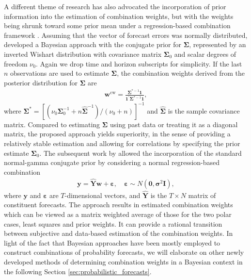 \documentclass[11pt]{article}
\begin{document}
A different theme of research has also advocated the incorporation of prior information into the estimation of combination weights, but with the weights being shrunk toward some prior mean under a regression-based combination framework \citep{Newbold2002-wa}. Assuming that the vector of forecast errors was normally distributed, \cite{Clemen1986-pd} developed a Bayesian approach with the conjugate prior for $\boldsymbol{\Sigma}$, represented by an inverted Wishart distribution with covariance matrix $\boldsymbol{\Sigma}_{0}$ and scalar degrees of freedom $\nu_{0}$. Again we drop time and horizon subscripts for simplicity. If the last $n$ observations are used to estimate $\boldsymbol{\Sigma}$, the combination weights derived from the posterior distribution for $\boldsymbol{\Sigma}$ are
\begin{align*}
\boldsymbol{w}^{\text{cw}}=\frac{\boldsymbol{\Sigma}^{*-1}\mathbf{1}}{\mathbf{1}^{\prime} \boldsymbol{\Sigma}^{*-1} \mathbf{1}},
\end{align*}
where $\boldsymbol{\Sigma}^{*}=\left[\left(\nu_{0} \boldsymbol{\Sigma}_{0}^{-1}+n \hat{\boldsymbol{\Sigma}}^{-1}\right) /(\nu_{0}+n)\right]^{-1}$ and $\hat{\boldsymbol{\Sigma}}$ is the sample covariance matrix.
Compared to estimating $\boldsymbol{\Sigma}$ using past data or treating it as a diagonal matrix, the proposed approach yields superiority, in the sense of providing a relatively stable estimation and allowing for correlations by specifying the prior estimate $\boldsymbol{\Sigma}_{0}$. The subsequent work by \cite{Diebold1990-fk} allowed the incorporation of the standard normal-gamma conjugate prior by considering a normal regression-based combination
\begin{align*}
\mathbf{y}=\hat{\mathbf{Y}} \boldsymbol{w}+\boldsymbol{\varepsilon}, \quad \boldsymbol{\varepsilon} \sim N\left(\mathbf{0}, \boldsymbol{\sigma}^{2} \mathbf{I}\right),
\end{align*}
where $\mathbf{y}$ and $\boldsymbol{\varepsilon}$ are $T$-dimensional vectors, and $\hat{\mathbf{Y}}$ is the $T \times N$ matrix of constituent forecasts. The approach results in estimated combination weights which can be viewed as a matrix weighted average of those for the two polar cases, least squares and prior weights. It can provide a rational transition between subjective and data-based estimation of the combination weights. In light of the fact that Bayesian approaches have been mostly employed to construct combinations of probability forecasts, we will elaborate on other newly developed methods of determining combination weights in a Bayesian context in the following Section \ref{sec:probabilistic_forecasts}.
\end{document}
